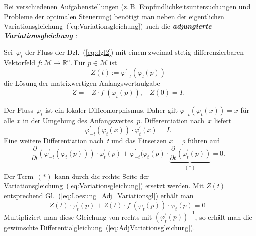 Bei verschiedenen Aufgabenstellungen (z.\,B. Empfindlichkeitsuntersuchungen
und Probleme der optimalen Steuerung) benötigt man neben der eigentlichen
Variationsgleichung~(\ref{eq:Variationsgleichung}) auch die \textbf{\em adjungierte
Variationsgleichung}~\cite[Lemma~{4.4.4}]{sontag98}:
\begin{proposition}
\label{pro:Adjungierte-Variationsgleichung}Sei~$\varphi_{t}$
der Fluss der Dgl.~(\ref{eq:dgl2}) mit einem zweimal stetig differenzierbaren
Vektorfeld $f:\mathcal{M}\to{\mathbb{R}}^{n}$. Für $p\in\mathcal{M}$ ist
\begin{equation}
Z(t):=\varphi_{-t}^{\prime}(\varphi_{t}(p))\label{eq:Loesung_Adj_Variationsgl}
\end{equation}
 die Lösung der matrixwertigen Anfangswertaufgabe
\begin{equation}
\dot{Z}=-Z\cdot f^{\prime}(\varphi_{t}(p)),\quad Z(0)=I.\label{eq:AdjVariationsgleichung}
\end{equation}
\end{proposition}
\begin{svmultproof}
Der Fluss~$\varphi_{t}$ ist ein lokaler Diffeomorphismus. Daher
gilt $\varphi_{-t}(\varphi_{t}(x))=x$ für alle $x$ in der Umgebung
des Anfangswertes~$p$. Differentiation nach~$x$ liefert
\begin{equation}
\varphi_{-t}^{\prime}(\varphi_{t}(x))\cdot\varphi_{t}^{\prime}(x)=I.\label{eq:Produkt_Variationsgln}
\end{equation}
Eine weitere Differentiation nach~$t$ und das Einsetzen $x=p$ führen
auf
\[
\frac{\partial}{\partial t}\left(\varphi_{-t}^{\prime}(\varphi_{t}(p))\right)\cdot\varphi_{t}^{\prime}(p)+\varphi_{-t}^{\prime}(\varphi_{t}(p)\cdot\underbrace{\frac{\partial}{\partial t}\left(\varphi_{t}^{\prime}(p)\right)}_{{\displaystyle (*)}}=0.
\]
Der Term~$(*)$ kann durch die rechte Seite der Variationsgleichung~(\ref{eq:Variationsgleichung})
ersetzt werden. Mit $Z(t)$ entsprechend Gl.~(\ref{eq:Loesung_Adj_Variationsgl})
erhält man
\[
\dot{Z}(t)\cdot\varphi_{t}^{\prime}(p)+Z(t)\cdot f^{\prime}(\varphi_{t}(p))\cdot\varphi_{t}^{\prime}(p)=0.
\]
Multipliziert man diese Gleichung von rechts mit $(\varphi_{t}^{\prime}(p))^{-1}$,
so erhält man die gewünschte Differentialgleichung~(\ref{eq:AdjVariationsgleichung}).
\end{svmultproof}

